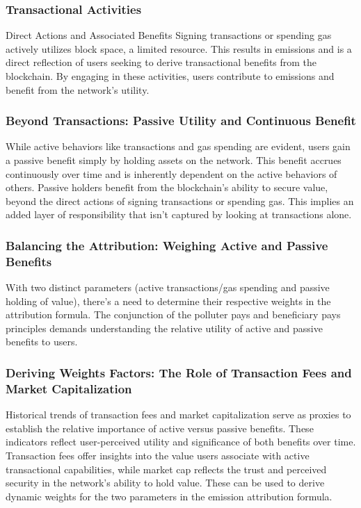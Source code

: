 \documentclass[11pt]{report}
\begin{document}
\subsubsection*{Transactional Activities}

Direct Actions and Associated Benefits
Signing transactions or spending gas actively utilizes block space, a limited resource. This results in emissions and is a direct reflection of users seeking to derive transactional benefits from the blockchain. By engaging in these activities, users contribute to emissions and benefit from the network's utility.

\subsubsection*{Beyond Transactions: Passive Utility and Continuous Benefit}
While active behaviors like transactions and gas spending are evident, users gain a passive benefit simply by holding assets on the network. This benefit accrues continuously over time and is inherently dependent on the active behaviors of others. Passive holders benefit from the blockchain's ability to secure value, beyond the direct actions of signing transactions or spending gas. This implies an added layer of responsibility that isn't captured by looking at transactions alone.

\subsubsection*{Balancing the Attribution: Weighing Active and Passive Benefits}
With two distinct parameters (active transactions/gas spending and passive holding of value), there's a need to determine their respective weights in the attribution formula. The conjunction of the polluter pays and beneficiary pays principles demands understanding the relative utility of active and passive benefits to users.

\subsubsection*{Deriving Weights Factors: The Role of Transaction Fees and Market Capitalization}
Historical trends of transaction fees and market capitalization serve as proxies to establish the relative importance of active versus passive benefits. These indicators reflect user-perceived utility and significance of both benefits over time. Transaction fees offer insights into the value users associate with active transactional capabilities, while market cap reflects the trust and perceived security in the network's ability to hold value. These can be used to derive dynamic weights for the two parameters in the emission attribution formula.
\end{document}

